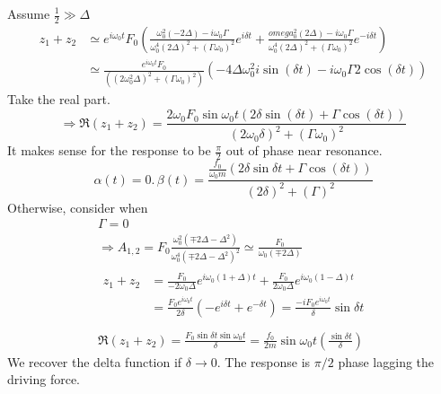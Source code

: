 \documentclass[twoside,10pt]{amsart}
\begin{document}
Assume $\frac{1}{2} \gg \Delta $
\[
\begin{aligned}
z_1 + z_2 & \simeq e^{i\omega_0 t } F_0 \left( \frac{ \omega_0^2 (-2 \Delta ) - i \omega_0 \Gamma }{ \omega_0^4 (2 \Delta)^2 + (\Gamma \omega_0)^2 } e^{i\delta t } + \frac{ omega_0^2 (2 \Delta) - i \omega_0 \Gamma}{ \omega_0^4 (2 \Delta)^2 + (\Gamma \omega_0)^2 } e^{ -i \delta t }  \right)  \\ 
&  \simeq \frac{ e^{i \omega_0 t } F_0 }{ ( (2 \omega_0^2 \Delta )^2 + (\Gamma \omega_0)^2 ) } ( -4 \Delta \omega_0^2 i \sin{ (\delta t ) } - i \omega_0 \Gamma 2 \cos{ (\delta t )} )   
\end{aligned}
\]
Take the real part.
\[
\Longrightarrow \Re (z_1 + z_2) = \frac{ 2 \omega_0 F_0 \sin{\omega_0 t } ( 2 \delta \sin{(\delta t )} + \Gamma \cos{ (\delta t )} ) }{ (2 \omega_0 \delta )^2 + (\Gamma \omega_0)^2 }  
\]
It makes sense for the response to be $\frac{\pi}{2}$ out of phase near resonance.  
\[
\boxed{ \alpha (t)= 0. \, \beta (t) = \frac{ \frac{ f_0 }{ \omega_0 m} (2 \delta \sin{ \delta t } + \Gamma \cos{ (\delta t )} ) }{ (2 \delta)^2 + (\Gamma)^2 }  }
\]
Otherwise, consider when 
\[
\begin{gathered}
  \Gamma =0 \\
  \Longrightarrow A_{1,2} = F_0 \frac{ \omega_0^2 ( \mp 2 \Delta - \Delta^2 ) }{ \omega_0^4 ( \mp 2 \Delta - \Delta^2 )^2} \simeq \frac{ F_0 }{ \omega_0 ( \mp 2 \Delta ) }  \\
  \begin{aligned}
    z_1 + z_2 & = \frac{ F_0 }{ -2 \omega_0 \Delta } e^{i \omega_0 (1+ \Delta) t } + \frac{ F_0 }{ 2 \omega_0 \Delta } e^{i\omega_0 (1 - \Delta) t }  \\
    & = \frac{F_0 e^{i\omega_0 t } }{ 2 \delta } ( -e^{i\delta t } + e^{-\delta t } ) = \frac{ - i F_0 e^{i\omega_0 t }}{ \delta } \sin{\delta t }  \\
  \end{aligned} \\
  \Re (z_1 + z_2 ) = \frac{ F_0 \sin{\delta t } \sin{\omega_0 t } }{ \delta} = \frac{ f_0}{2m} \sin{\omega_0 t } \left( \frac{ \sin{\delta t } }{ \delta } \right)  
\end{gathered}
\]
We recover the delta function if $\delta \to 0$.  The response is $\pi/2$ phase lagging the driving force.  
\end{document}
